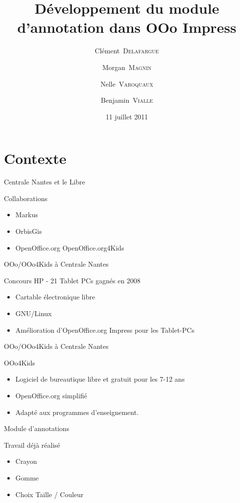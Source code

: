 \documentclass{beamer}
\title{Développement du module d'annotation dans OOo Impress}
\author{Clément~\textsc{Delafargue} \and Morgan~\textsc{Magnin} \and Nelle~\textsc{Varoquaux}\and Benjamin~\textsc{Vialle}}
\institute[\textsc{ECN}]{École Centrale de Nantes}
\date{11 juillet 2011}
\begin{document}
\frame{\titlepage}

\section{Contexte}

\begin{frame}{Centrale Nantes et le Libre}
	\begin{block}{Collaborations}
		\begin{itemize}[<+->]
			\item Markus
			\item OrbisGis
			\item OpenOffice.org OpenOffice.org4Kids
		\end{itemize}
	\end{block}
\end{frame}

\begin{frame}{OOo/OOo4Kids à Centrale Nantes}
	\begin{block}{Concours HP - 21 Tablet PCs gagnés en 2008}
		\begin{itemize}[<+->]
            \item Cartable électronique libre
            \item GNU/Linux
            \item Amélioration d'OpenOffice.org Impress pour les Tablet-PCs
		\end{itemize}
	\end{block}
\end{frame}
\begin{frame}{OOo/OOo4Kids à Centrale Nantes}
	\begin{block}{OOo4Kids}
		\begin{itemize}[<+->]
            \item Logiciel de bureautique libre et gratuit pour les 7-12 ans
            \item OpenOffice.org simplifié
            \item Adapté aux programmes d'enseignement.
		\end{itemize}
	\end{block}
\end{frame}

\begin{frame}{Module d'annotations}
    \begin{block}{Travail déjà réalisé}
        \begin{itemize}[<+->]
            \item Crayon
            \item Gomme
            \item Choix Taille / Couleur
        \end{itemize}
    \end{block}
\end{frame}
\end{document}
